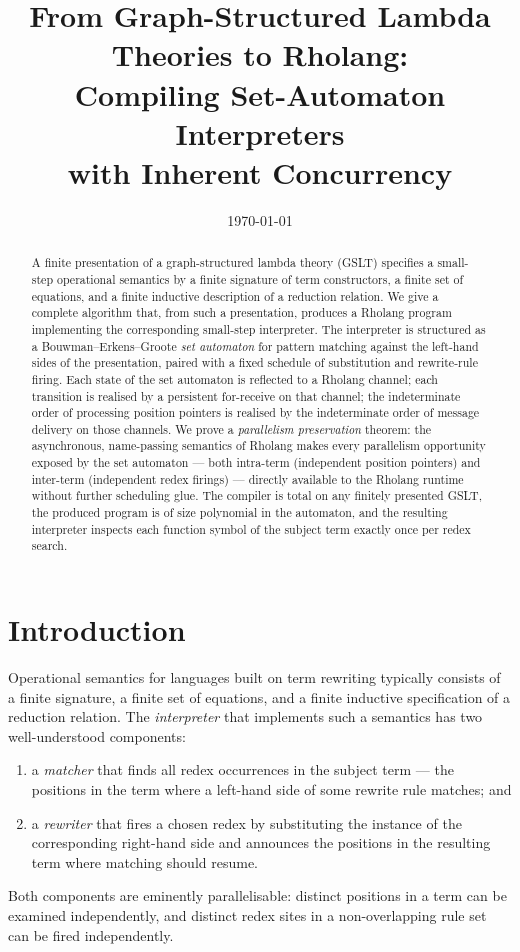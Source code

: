 \documentclass[11pt]{article}
\title{From Graph-Structured Lambda Theories to Rholang:\\
       Compiling Set-Automaton Interpreters\\ with Inherent Concurrency}
\author{}
\date{\today}
\theoremstyle{plain}
\theoremstyle{definition}
\theoremstyle{remark}
\begin{document}
\maketitle

\begin{abstract}
A finite presentation of a graph-structured lambda theory (GSLT) specifies a
small-step operational semantics by a finite signature of term constructors,
a finite set of equations, and a finite inductive description of a reduction
relation. We give a complete algorithm that, from such a presentation,
produces a Rholang program implementing the corresponding small-step
interpreter. The interpreter is structured as a Bouwman--Erkens--Groote
\emph{set automaton} for pattern matching against the left-hand sides of the
presentation, paired with a fixed schedule of substitution and rewrite-rule
firing. Each state of the set automaton is reflected to a Rholang channel;
each transition is realised by a persistent \textsf{for}-receive on that
channel; the indeterminate order of processing position pointers is realised
by the indeterminate order of message delivery on those channels. We prove a
\emph{parallelism preservation} theorem: the asynchronous, name-passing
semantics of Rholang makes every parallelism opportunity exposed by the set
automaton --- both intra-term (independent position pointers) and inter-term
(independent redex firings) --- directly available to the Rholang runtime
without further scheduling glue. The compiler is total on any finitely
presented GSLT, the produced program is of size polynomial in the automaton,
and the resulting interpreter inspects each function symbol of the subject
term exactly once per redex search.
\end{abstract}

\tableofcontents

\section{Introduction}\label{sec:intro}

Operational semantics for languages built on term rewriting typically
consists of a finite signature, a finite set of equations, and a finite
inductive specification of a reduction relation. The \emph{interpreter}
that implements such a semantics has two well-understood components:
\begin{enumerate}[leftmargin=*]
  \item a \emph{matcher} that finds all redex occurrences in the subject
        term --- the positions in the term where a left-hand side of some
        rewrite rule matches; and
  \item a \emph{rewriter} that fires a chosen redex by substituting the
        instance of the corresponding right-hand side and announces the
        positions in the resulting term where matching should resume.
\end{enumerate}
Both components are eminently parallelisable: distinct positions in a term
can be examined independently, and distinct redex sites in a non-overlapping
rule set can be fired independently.
\end{document}
